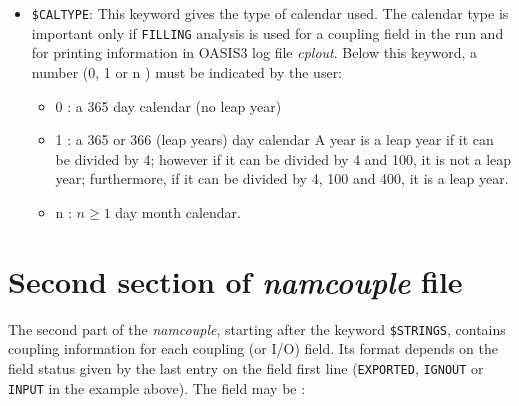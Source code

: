 \begin{itemize}
\item {\tt \$CALTYPE}: This keyword gives the type of calendar
  used. The calendar type is important only if {\tt FILLING}
  analysis is used for a coupling field in the run and for printing
  information in OASIS3 log file {\it cplout}. Below this keyword, a
  number (0, 1 or n ) must be indicated by the user:
  \begin{itemize}
  \item 0 : a 365 day calendar (no leap year) 
  \item 1 : a 365 or 366 (leap years) day calendar A year is a leap
  year if it can be divided by 4; however if it can be divided by 4
  and 100, it is not a leap year; furthermore, if it can be divided by
  4, 100 and 400, it is a leap year.
  \item n :  $n \ge 1$ day month calendar. 
  \end{itemize}

\end{itemize}


\section{Second section of {\it namcouple} file }
\label{subsec_namcouplesecond}

The second part of the {\it namcouple}, starting after the keyword
{\tt \$STRINGS}, contains coupling information for each coupling (or
I/O) field.  Its format depends on the field status given by the last
entry on the field first line ({\tt EXPORTED}, {\tt IGNOUT} or {\tt
INPUT} in the example above). The field may be :

